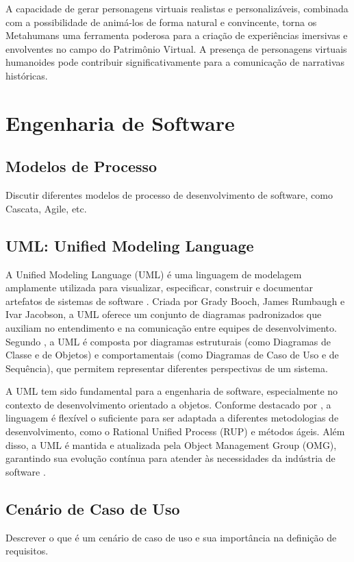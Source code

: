 A capacidade de gerar personagens virtuais realistas e personalizáveis, combinada com a possibilidade de animá-los de forma natural e convincente, torna os Metahumans uma ferramenta poderosa para a criação de experiências imersivas e envolventes no campo do Patrimônio Virtual. A presença de personagens virtuais humanoides pode contribuir significativamente para a comunicação de narrativas históricas.

\section{Engenharia de Software}
\subsection{Modelos de Processo}
Discutir diferentes modelos de processo de desenvolvimento de software, como Cascata, Agile, etc.

\subsection{UML: Unified Modeling Language}
A Unified Modeling Language (UML) é uma linguagem de modelagem amplamente utilizada para visualizar, especificar, construir e documentar artefatos de sistemas de software \citep{Booch2005}. Criada por Grady Booch, James Rumbaugh e Ivar Jacobson, a UML oferece um conjunto de diagramas padronizados que auxiliam no entendimento e na comunicação entre equipes de desenvolvimento. Segundo \cite{Booch2005}, a UML é composta por diagramas estruturais (como Diagramas de Classe e de Objetos) e comportamentais (como Diagramas de Caso de Uso e de Sequência), que permitem representar diferentes perspectivas de um sistema.

A UML tem sido fundamental para a engenharia de software, especialmente no contexto de desenvolvimento orientado a objetos. Conforme destacado por \cite{Fowler2005}, a linguagem é flexível o suficiente para ser adaptada a diferentes metodologias de desenvolvimento, como o Rational Unified Process (RUP) e métodos ágeis. Além disso, a UML é mantida e atualizada pela Object Management Group (OMG), garantindo sua evolução contínua para atender às necessidades da indústria de software \citep{OMG2017}.

\subsection{Cenário de Caso de Uso}
Descrever o que é um cenário de caso de uso e sua importância na definição de requisitos.

